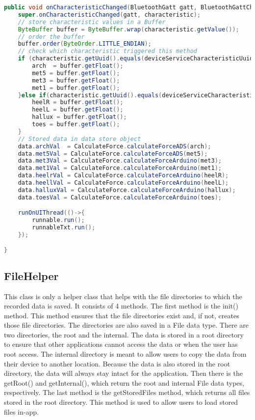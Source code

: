 \begin{lstlisting}[language=java,caption=onCharacteristicChanged() method, label=oncharchanged]
  public void onCharacteristicChanged(BluetoothGatt gatt, BluetoothGattCharacteristic characteristic) {
    super.onCharacteristicChanged(gatt, characteristic);
    // store characteristic values in a Buffer
    ByteBuffer buffer = ByteBuffer.wrap(characteristic.getValue()); 
    // order the buffer
    buffer.order(ByteOrder.LITTLE_ENDIAN);
    // check which characteristic triggered this method
    if (characteristic.getUuid().equals(deviceServiceCharacteristicUuid1)) {
        arch  = buffer.getFloat();
        met5 = buffer.getFloat();
        met3 = buffer.getFloat();
        met1 = buffer.getFloat();
    }else if(characteristic.getUuid().equals(deviceServiceCharacteristicUuid2)){
        heelR = buffer.getFloat();
        heelL = buffer.getFloat();
        hallux = buffer.getFloat();
        toes = buffer.getFloat();
    }
    // Stored data in data store object
    data.archVal  = CalculateForce.calculateForceADS(arch);
    data.met5Val = CalculateForce.calculateForceADS(met5);
    data.met3Val = CalculateForce.calculateForceArduino(met3);
    data.met1Val = CalculateForce.calculateForceArduino(met1);
    data.heelrVal = CalculateForce.calculateForceArduino(heelR);
    data.heellVal = CalculateForce.calculateForceArduino(heelL);
    data.halluxVal = CalculateForce.calculateForceArduino(hallux);
    data.toesVal = CalculateForce.calculateForceArduino(toes);

    runOnUIThread(()->{
        runnable.run();
        runnableTxt.run();
    });

}
\end{lstlisting}
\clearpage
\subsection{FileHelper}
This class is only a helper class that helps with the file directories to which the recorded data is saved. It consists of 4 methods. The first method is the init() method. This method ensures that the file directories exist and, if not, creates those file directories. The directories are also saved in a File data type. There are two directories, the root and the internal. The data is stored in a root directory to ensure that other applications cannot access the data or when the user has root access. The internal directory is meant to allow users to copy the data from their device to another location. Because the data is also stored in the root directory, the data will always stay intact for the application. Then there is the getRoot() and getInternal(), which return the root and internal File data types, respectively. The last method is the getStoredFiles method, which returns all files stored in the root directory. This method is used to allow users to load stored files in-app.


